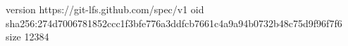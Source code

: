 version https://git-lfs.github.com/spec/v1
oid sha256:274d7006781852ccc1f3bfe776a3ddfcb7661c4a9a94b0732b48c75d9f96f7f6
size 12384
